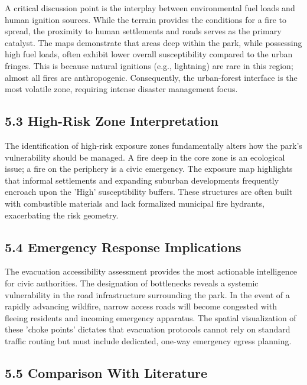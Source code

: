 \documentclass[12pt,a4paper]{article}
\begin{document}
A critical discussion point is the interplay between environmental fuel loads and human ignition sources. While the terrain provides the conditions for a fire to spread, the proximity to human settlements and roads serves as the primary catalyst. The maps demonstrate that areas deep within the park, while possessing high fuel loads, often exhibit lower overall susceptibility compared to the urban fringes. This is because natural ignitions (e.g., lightning) are rare in this region; almost all fires are anthropogenic. Consequently, the urban-forest interface is the most volatile zone, requiring intense disaster management focus.



\subsection*{5.3 High-Risk Zone Interpretation}

The identification of high-risk exposure zones fundamentally alters how the park's vulnerability should be managed. A fire deep in the core zone is an ecological issue; a fire on the periphery is a civic emergency. The exposure map highlights that informal settlements and expanding suburban developments frequently encroach upon the 'High' susceptibility buffers. These structures are often built with combustible materials and lack formalized municipal fire hydrants, exacerbating the risk geometry.



\subsection*{5.4 Emergency Response Implications}

The evacuation accessibility assessment provides the most actionable intelligence for civic authorities. The designation of bottlenecks reveals a systemic vulnerability in the road infrastructure surrounding the park. In the event of a rapidly advancing wildfire, narrow access roads will become congested with fleeing residents and incoming emergency apparatus. The spatial visualization of these 'choke points' dictates that evacuation protocols cannot rely on standard traffic routing but must include dedicated, one-way emergency egress planning.



\subsection*{5.5 Comparison With Literature}
\end{document}
